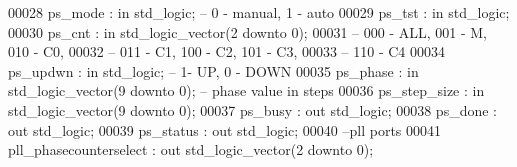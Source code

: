 \begin{DoxyCode}
00028       \textcolor{vhdlchar}{ps_mode}                       \textcolor{vhdlchar}{:} \textcolor{keywordflow}{in} \textcolor{comment}{std\_logic};\textcolor{keyword}{ -- 0 - manual, 1 - auto}
00029       \textcolor{vhdlchar}{ps_tst}                        \textcolor{vhdlchar}{:} \textcolor{keywordflow}{in} \textcolor{comment}{std\_logic};
00030       \textcolor{vhdlchar}{ps_cnt}                        \textcolor{vhdlchar}{:} \textcolor{keywordflow}{in} \textcolor{comment}{std\_logic\_vector}\textcolor{vhdlchar}{(}\textcolor{vhdllogic}{}\textcolor{vhdllogic}{2} \textcolor{keywordflow}{downto} \textcolor{vhdllogic}{}\textcolor{vhdllogic}{0}\textcolor{vhdlchar}{)}; 
00031 \textcolor{keyword}{                                                   -- 000 - ALL, 001 -   M, 010 - C0,}
00032 \textcolor{keyword}{                                                   -- 011 -  C1, 100 -  C2, 101 - C3,}
00033 \textcolor{keyword}{                                                   -- 110 -  C4}
00034       \textcolor{vhdlchar}{ps_updwn}                      \textcolor{vhdlchar}{:} \textcolor{keywordflow}{in} \textcolor{comment}{std\_logic};\textcolor{keyword}{ -- 1- UP, 0 - DOWN }
00035       \textcolor{vhdlchar}{ps_phase}                      \textcolor{vhdlchar}{:} \textcolor{keywordflow}{in} \textcolor{comment}{std\_logic\_vector}\textcolor{vhdlchar}{(}\textcolor{vhdllogic}{}\textcolor{vhdllogic}{9} \textcolor{keywordflow}{downto} \textcolor{vhdllogic}{}\textcolor{vhdllogic}{0}\textcolor{vhdlchar}{)};\textcolor{keyword}{ -- phase value in steps}
00036       \textcolor{vhdlchar}{ps_step_size}                  \textcolor{vhdlchar}{:} \textcolor{keywordflow}{in} \textcolor{comment}{std\_logic\_vector}\textcolor{vhdlchar}{(}\textcolor{vhdllogic}{}\textcolor{vhdllogic}{9} \textcolor{keywordflow}{downto} \textcolor{vhdllogic}{}\textcolor{vhdllogic}{0}\textcolor{vhdlchar}{)};
00037       \textcolor{vhdlchar}{ps_busy}                       \textcolor{vhdlchar}{:} \textcolor{keywordflow}{out} \textcolor{comment}{std\_logic};
00038       \textcolor{vhdlchar}{ps_done}                       \textcolor{vhdlchar}{:} \textcolor{keywordflow}{out} \textcolor{comment}{std\_logic};
00039       \textcolor{vhdlchar}{ps_status}                     \textcolor{vhdlchar}{:} \textcolor{keywordflow}{out} \textcolor{comment}{std\_logic};     
00040 \textcolor{keyword}{      --pll ports}
00041       \textcolor{vhdlchar}{pll_phasecounterselect}        \textcolor{vhdlchar}{:} \textcolor{keywordflow}{out} \textcolor{comment}{std\_logic\_vector}\textcolor{vhdlchar}{(}\textcolor{vhdllogic}{}\textcolor{vhdllogic}{2} \textcolor{keywordflow}{downto} \textcolor{vhdllogic}{}\textcolor{vhdllogic}{0}\textcolor{vhdlchar}{)};

\end{DoxyCode}
